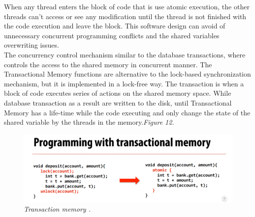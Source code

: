 \documentclass[12pt]{article}
\begin{document}
When any thread enters the block of code that is use atomic execution, the other threads can't access or see any modification until the thread is not finished with the code execution and leave the block. This software design can avoid of unnecessary concurrent programming conflicts and the shared variables overwriting issues. \cite{BDJ}\\


The concurrency control mechanism similar to the database transactions, where controls the access to the shared memory in concurrent manner. The Transactional Memory functions are alternative to the lock-based synchronization mechanism, but it is implemented in a lock-free way. The transaction is when a block of code executes series of actions on the shared memory space. \citep{STM} While database transaction as a result are written to the disk, until Transactional Memory has a life-time while the code executing and only change the state of the shared variable by the threads in the memory.\textit{\color{gray}Figure 12.}

\begin{figure}[h!]
\centering
\includegraphics[scale=0.2]{Pictures/lockvsatomicjpg.png}
\caption{\textit{\color{gray}Transaction memory \cite{TMvsLock}.}}
\end{figure}
\end{document}
